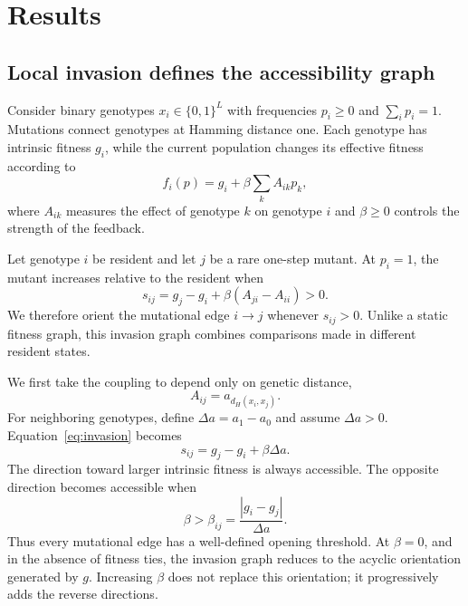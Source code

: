 \documentclass[11pt,reqno]{amsart}
\begin{document}
\section{Results}

\subsection{Local invasion defines the accessibility graph}

Consider binary genotypes $x_i \in \{0,1\}^L$ with frequencies $p_i \geq 0$ and $\sum_i p_i = 1$. Mutations connect genotypes at Hamming distance one. Each genotype has intrinsic fitness $g_i$, while the current population changes its effective fitness according to
\begin{equation}
f_i(p)
=
g_i
+
\beta \sum_k A_{ik} p_k,
\label{eq:fitness}
\end{equation}
where $A_{ik}$ measures the effect of genotype $k$ on genotype $i$ and $\beta \geq 0$ controls the strength of the feedback.

Let genotype $i$ be resident and let $j$ be a rare one-step mutant. At $p_i=1$, the mutant increases relative to the resident when
\begin{equation}
s_{ij}
=
g_j-g_i
+
\beta (A_{ji}-A_{ii})
>
0.
\label{eq:invasion}
\end{equation}
We therefore orient the mutational edge $i\to j$ whenever $s_{ij}>0$. Unlike a static fitness graph, this invasion graph combines comparisons made in different resident states.

We first take the coupling to depend only on genetic distance,
\begin{equation}
A_{ij}
=
a_{d_H(x_i,x_j)}.
\label{eq:radial-coupling}
\end{equation}
For neighboring genotypes, define $\Delta a=a_1-a_0$ and assume $\Delta a>0$. Equation~\eqref{eq:invasion} becomes
\begin{equation}
s_{ij}
=
g_j-g_i+\beta \Delta a.
\end{equation}
The direction toward larger intrinsic fitness is always accessible. The opposite direction becomes accessible when
\begin{equation}
\beta
>
\beta_{ij}
=
\frac{|g_i-g_j|}{\Delta a}.
\label{eq:edge-threshold}
\end{equation}
Thus every mutational edge has a well-defined opening threshold. At $\beta=0$, and in the absence of fitness ties, the invasion graph reduces to the acyclic orientation generated by $g$. Increasing $\beta$ does not replace this orientation; it progressively adds the reverse directions.
\end{document}

